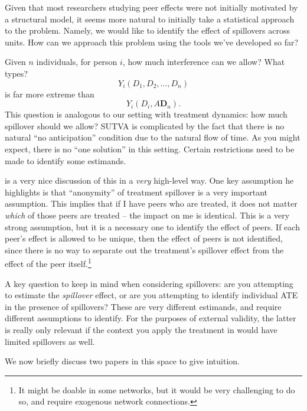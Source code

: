 \documentclass{tufte-handout}
\theoremstyle{break}
\begin{document}
Given that most researchers studying peer effects were not initially motivated by a structural model, it seems more natural to initially take a statistical approach to the problem. Namely, we would like to identify the effect of spillovers across units. How can we approach this problem using the tools we've developed so far?

Given $n$ individuals, for person $i$, how much interference can we allow? What types? 
    \begin{equation*}
      Y_{i}(D_{1}, D_{2}, \ldots, D_{n})
    \end{equation*}
    is far more extreme than
    \begin{equation*}
      Y_{i}(D_{i}, A\mathbf{D}_{n}).
    \end{equation*}
This question is analogous to our setting with treatment dynamics: how much spillover should we allow? SUTVA is complicated by the fact that there is no natural ``no anticipation'' condition due to the natural flow of time. As you might expect, there is no ``one solution'' in this setting. Certain restrictions need to be made to identify some estimands.

\citet{manski2013identification} is a very nice discussion of this in a \emph{very} high-level way. One key assumption he highlights is that ``anonymity'' of treatment spillover is a very important assumption. This implies that if I have peers who are treated, it does not matter \emph{which} of those peers are treated -- the impact on me is identical. This is a very strong assumption, but it is a necessary one to identify the effect of peers. If each peer's effect is allowed to be unique, then the effect of peers is not identified, since there is no way to separate out the treatment's spillover effect from the effect of the peer itself.\footnote{It might be doable in some networks, but it would be very challenging to do so, and require exogenous network connections.}

A key question to keep in mind when considering spillovers: are you attempting to estimate the \emph{spillover} effect, or are you attempting to identify individual ATE in the presence of spillovers? These are very different estimands, and require different assumptions to identify. For the purposes of external validity, the latter is really only relevant if the context you apply the treatment in would have limited spillovers as well. 

We now briefly discuss two papers in this space to give intuition.
\end{document}
